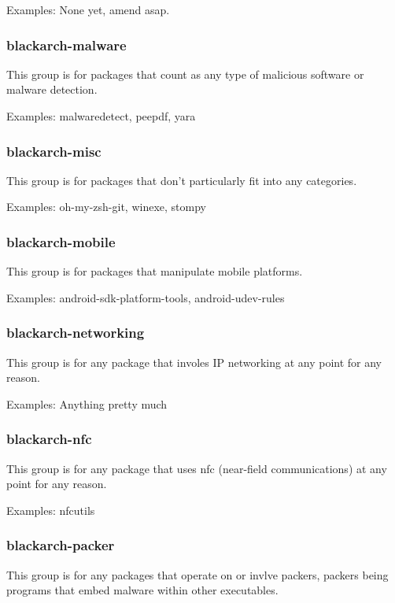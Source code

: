 \documentclass[a4paper, oneside, 11pt]{book}
\begin{document}
Examples: None yet, amend asap.

\subsubsection{blackarch-malware}

This group is for packages that count as any type of malicious software or malware detection.

Examples: malwaredetect, peepdf, yara

\subsubsection{blackarch-misc}

This group is for packages that don't particularly fit into any categories.

Examples: oh-my-zsh-git, winexe, stompy

\subsubsection{blackarch-mobile}

This group is for packages that manipulate mobile platforms.

Examples: android-sdk-platform-tools, android-udev-rules

\subsubsection{blackarch-networking}

This group is for any package that involes IP networking at any point for any reason.

Examples: Anything pretty much

\subsubsection{blackarch-nfc}

This group is for any package that uses nfc (near-field communications) at any point for any reason.

Examples: nfcutils

\subsubsection{blackarch-packer}

This group is for any packages that operate on or invlve packers, packers being programs that embed malware within other executables.
\end{document}

